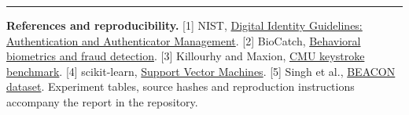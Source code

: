 \documentclass[10pt,a4paper]{article}
\begin{document}
\vspace{2pt}\hrule\vspace{3pt}
{\scriptsize\textbf{References and reproducibility.}
[1] NIST, \href{https://pages.nist.gov/800-63-4/sp800-63b.html}{Digital Identity Guidelines: Authentication and Authenticator Management}.
[2] BioCatch, \href{https://www.biocatch.com/what-we-do}{Behavioral biometrics and fraud detection}.
[3] Killourhy and Maxion, \href{https://www.cs.cmu.edu/~keystroke/}{CMU keystroke benchmark}.
[4] scikit-learn, \href{https://scikit-learn.org/1.7/modules/svm.html}{Support Vector Machines}.
[5] Singh et al., \href{https://huggingface.co/datasets/beacon-gui/BEACON-Dataset}{BEACON dataset}.
Experiment tables, source hashes and reproduction instructions accompany the report in the repository.}
\end{document}
